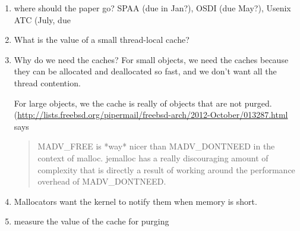 \begin{enumerate}
 \item where should the paper go?  SPAA (due in Jan?), OSDI (due May?), Usenix ATC (July, due

 \item What is the value of a small thread-local cache?

 \item Why do we need the caches?
  For small objects, we need the caches because they can be allocated and deallocated so fast, and we don't want all the thread contention.

  For large objects, we the cache is really of objects that are not purged.  (\url{http://lists.freebsd.org/pipermail/freebsd-arch/2012-October/013287.html} says 
\begin{quote}
MADV\_FREE is *way* nicer than MADV\_DONTNEED in the context of malloc.  jemalloc has a really discouraging amount of complexity that is directly a result of working around the performance overhead of MADV\_DONTNEED.
\end{quote}
 
 \item Mallocators want the kernel to notify them when memory is short.

 \item measure the value of the cache for purging
\end{enumerate}
